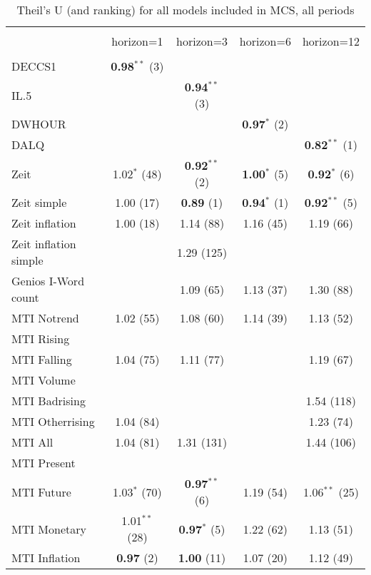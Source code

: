 
\begin{table}[!htbp] \centering 
  \caption{Theil's U (and ranking) for all models included in MCS, all periods} 
  \label{} 
\scriptsize 
\begin{tabular}{@{\extracolsep{5pt}} lcccc} 
\\[-1.8ex]\hline 
\hline \\[-1.8ex] 
 & horizon=1 & horizon=3 & horizon=6 & horizon=12 \\ 
\hline \\[-1.8ex] 
DECCS1 & \textbf{0.98$^{**}$} (3) &  &  &  \\ 
IL.5 &  & \textbf{0.94$^{**}$} (3) &  &  \\ 
DWHOUR &  &  & \textbf{0.97$^{*}$} (2) &  \\ 
DALQ &  &  &  & \textbf{0.82$^{**}$} (1) \\ 
Zeit & 1.02$^{*}$ (48) & \textbf{0.92$^{**}$} (2) & \textbf{1.00$^{*}$} (5) & \textbf{0.92$^{*}$} (6) \\ 
Zeit simple & 1.00 (17) & \textbf{0.89} (1) & \textbf{0.94$^{*}$} (1) & \textbf{0.92$^{**}$} (5) \\ 
Zeit inflation & 1.00 (18) & 1.14 (88) & 1.16 (45) & 1.19 (66) \\ 
Zeit inflation simple &  & 1.29 (125) &  &  \\ 
Genios I-Word count &  & 1.09 (65) & 1.13 (37) & 1.30 (88) \\ 
MTI Notrend & 1.02 (55) & 1.08 (60) & 1.14 (39) & 1.13 (52) \\ 
MTI Rising &  &  &  &  \\ 
MTI Falling & 1.04 (75) & 1.11 (77) &  & 1.19 (67) \\ 
MTI Volume &  &  &  &  \\ 
MTI Badrising &  &  &  & 1.54 (118) \\ 
MTI Otherrising & 1.04 (84) &  &  & 1.23 (74) \\ 
MTI All & 1.04 (81) & 1.31 (131) &  & 1.44 (106) \\ 
MTI Present &  &  &  &  \\ 
MTI Future & 1.03$^{*}$ (70) & \textbf{0.97$^{**}$} (6) & 1.19 (54) & 1.06$^{**}$ (25) \\ 
MTI Monetary & 1.01$^{**}$ (28) & \textbf{0.97$^{*}$} (5) & 1.22 (62) & 1.13 (51) \\ 
MTI Inflation & \textbf{0.97} (2) & \textbf{1.00} (11) & 1.07 (20) & 1.12 (49) \\ 

\end{tabular}
\end{table}
